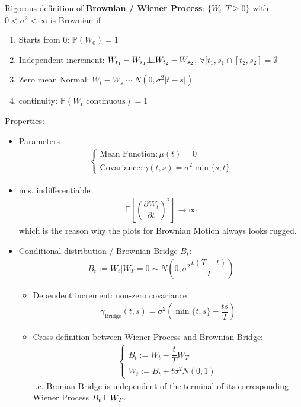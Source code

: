 Rigorous definition of \textbf{Brownian / Wiener Process}: $ \{W_t:T\geq 0\} $ with $ 0<\sigma ^2<\infty $ is Brownian if
\begin{enumerate}[topsep=2pt,itemsep=2pt]
    \item Starts from $ 0 $: $ \mathbb{P}\left( W_0 \right) =1 $
    \item Independent increment: $ W_{t_1}-W_{s_1}\bot\!\!\!\bot W_{t_2}-W_{s_2} $, $  \forall [t_1,s_1\cap [t_2,s_2]=\emptyset $
    \item Zero mean Normal: $ W_t-W_s\sim N(0,\sigma ^2\vert t-s\vert) $
    \item continuity: $ \mathbb{P}\left( W_t\text{ continuous} \right) =1 $ 
\end{enumerate}

Properties:
\begin{itemize}[topsep=2pt,itemsep=0pt]
        \item Parameters
        \begin{align*}
            \begin{cases}
                \text{Mean Function}:\mu (t)=0\\
                \text{Covariance}:\gamma (t,s)=\sigma ^2 \min\{s,t\} 
            \end{cases} 
        \end{align*}
        \item m.s. indifferentiable
        \begin{align*}
            \mathbb{E}\left[ \left(\dfrac{\partial^{} W_t}{\partial t^{}}\right)^2 \right]\to \infty  
        \end{align*}
        which is the reason why the plots for Brownian Motion always looks rugged.
        \item Conditional distribution / Brownian Bridge $ B_t $:
        \begin{align*}
            B_t := W_t|W_T=0 \sim N(0,\sigma ^2\dfrac{t(T-t)}{T})
        \end{align*}
        \begin{itemize}[topsep=2pt,itemsep=0pt]
            \item Dependent increment: non-zero covariance
        \begin{align*}
            \gamma_\mathrm{Bridge}  (t,s) = \sigma ^2\left(\min\{t,s\}-\dfrac{ts}{T}\right)
        \end{align*}
            \item Cross definition between Wiener Process and Brownian Bridge:
            \begin{align*}
                \begin{cases}
                    B_t:=W_t-\dfrac{t}{T}W_T\\
                    W_t:=B_t+t \sigma ^2 N(0,1) 
                \end{cases}
            \end{align*}
            i.e. Bronian Bridge is independent of the terminal of its corresponding Wiener Process $ B_t\bot\!\!\!\bot W_T $.
        \end{itemize}
\end{itemize}

